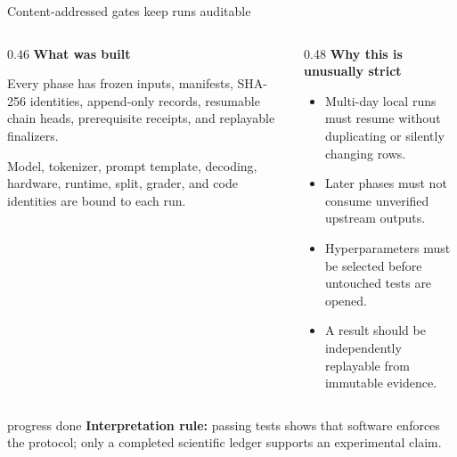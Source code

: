\documentclass[aspectratio=169,11pt]{beamer}
\begin{document}
\begin{frame}{Content-addressed gates keep runs auditable}
  \footnotesize
  \begin{columns}[T,onlytextwidth]
    \begin{column}{0.46\textwidth}
      \textbf{What was built}\par\vspace{0.15cm}
      Every phase has frozen inputs, manifests, SHA-256 identities, append-only records, resumable chain heads, prerequisite receipts, and replayable finalizers.\par\vspace{0.25cm}
      Model, tokenizer, prompt template, decoding, hardware, runtime, split, grader, and code identities are bound to each run.
    \end{column}
    \begin{column}{0.48\textwidth}
      \textbf{Why this is unusually strict}\par\vspace{0.15cm}
      \begin{itemize}\setlength\itemsep{0.06cm}
        \item Multi-day local runs must resume without duplicating or silently changing rows.
        \item Later phases must not consume unverified upstream outputs.
        \item Hyperparameters must be selected before untouched tests are opened.
        \item A result should be independently replayable from immutable evidence.
      \end{itemize}
    \end{column}
  \end{columns}
  \vspace{0.15cm}
  \begin{beamercolorbox}[rounded=true,sep=0.28em]{progress done}
    \textbf{Interpretation rule:} passing tests shows that software enforces the protocol; only a completed scientific ledger supports an experimental claim.
  \end{beamercolorbox}
\end{frame}
\end{document}

